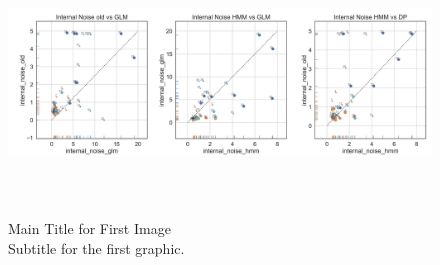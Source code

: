 \begin{figure}[H]
    \centering
    \includegraphics[width=17cm,height=7cm]{MainLayout/Images/chapter8/internal_noise_comparison_types_glms.jpg}
    \caption{Main Title for First Image \\ \small Subtitle for the first graphic.}
    \label{fig:internal_noise_comparison_types_glms}
\end{figure}
